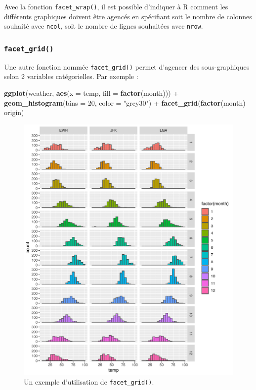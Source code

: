 \documentclass[a4paperpaper,]{article}
\newenvironment{Shaded}{\begin{snugshade}}{\end{snugshade}}
\newcommand{\DataTypeTok}[1]{\textcolor[rgb]{0.00,0.34,0.68}{#1}}
\newcommand{\DecValTok}[1]{\textcolor[rgb]{0.69,0.50,0.00}{#1}}
\newcommand{\KeywordTok}[1]{\textcolor[rgb]{0.12,0.11,0.11}{\textbf{#1}}}
\newcommand{\NormalTok}[1]{\textcolor[rgb]{0.12,0.11,0.11}{#1}}
\newcommand{\OperatorTok}[1]{\textcolor[rgb]{0.12,0.11,0.11}{#1}}
\newcommand{\StringTok}[1]{\textcolor[rgb]{0.75,0.01,0.01}{#1}}
\theoremstyle{definition}
\theoremstyle{definition}
\theoremstyle{definition}
\theoremstyle{remark}
\begin{document}
Avec la fonction \texttt{facet\_wrap()}, il est possible d'indiquer à R
comment les différents graphiques doivent être agencés en spécifiant
soit le nombre de colonnes souhaité avec \texttt{ncol}, soit le nombre
de lignes souhaitées avec \texttt{nrow}.

\hypertarget{facet_grid}{%
\subsubsection{\texorpdfstring{\texttt{facet\_grid()}}{facet\_grid()}}\label{facet_grid}}

Une autre fonction nommée \texttt{facet\_grid()} permet d'agencer des
sous-graphiques selon 2 variables catégorielles. Par exemple :

\begin{Shaded}
\begin{Highlighting}[]
\KeywordTok{ggplot}\NormalTok{(weather, }\KeywordTok{aes}\NormalTok{(}\DataTypeTok{x =}\NormalTok{ temp, }\DataTypeTok{fill =} \KeywordTok{factor}\NormalTok{(month))) }\OperatorTok{+}
\StringTok{  }\KeywordTok{geom_histogram}\NormalTok{(}\DataTypeTok{bins =} \DecValTok{20}\NormalTok{, }\DataTypeTok{color =} \StringTok{"grey30"}\NormalTok{) }\OperatorTok{+}
\StringTok{  }\KeywordTok{facet_grid}\NormalTok{(}\KeywordTok{factor}\NormalTok{(month) }\OperatorTok{~}\StringTok{ }\NormalTok{origin)}
\end{Highlighting}
\end{Shaded}

\begin{figure}[htpb]

{\centering \includegraphics[width=0.9\linewidth]{figure/grid-1} 

}

\caption{Un exemple d'utilisation de \texttt{facet\_grid()}.}\label{fig:grid}
\end{figure}
\end{document}
